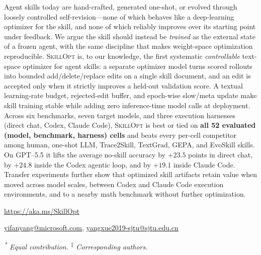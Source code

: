 \documentclass[
]{article}
\newcounter{none} %
\newcommand{\ourmethod}{\textsc{SkillOpt}\xspace}
\begin{document}
\vspace{0.45em}
\begin{msfttitlebox}
\setlength{\parindent}{0cm}
\setlength{\parskip}{0.14cm}
\raggedright
\nohyphens

Agent skills today are hand-crafted, generated one-shot, or evolved through loosely controlled self-revision---none of which behaves like a deep-learning optimizer for the skill, and none of which reliably improves over its starting point under feedback. We argue the skill should instead be \emph{trained} as the external state of a frozen agent, with the same discipline that makes weight-space optimization reproducible. \ourmethod{} is, to our knowledge, the first systematic \emph{controllable} text-space optimizer for agent skills: a separate optimizer model turns scored rollouts into bounded add/delete/replace edits on a single skill document, and an edit is accepted only when it strictly improves a held-out validation score. A textual learning-rate budget, rejected-edit buffer, and epoch-wise slow/meta update make skill training stable while adding zero inference-time model calls at deployment. Across six benchmarks, seven target models, and three execution harnesses (direct chat, Codex, Claude Code), \ourmethod{} is best or tied on \textbf{all 52 evaluated (model, benchmark, harness) cells} and beats every per-cell competitor among human, one-shot LLM, Trace2Skill, TextGrad, GEPA, and EvoSkill skills. On GPT--5.5 it lifts the average no-skill accuracy by $\mathbf{+23.5}$ points in direct chat, by $+24.8$ inside the Codex agentic loop, and by $+19.1$ inside Claude Code. Transfer experiments further show that optimized skill artifacts retain value when moved across model scales, between Codex and Claude Code execution environments, and to a nearby math benchmark without further optimization.

\vspace{0.14cm}
{\setlength{\parskip}{0.06cm}\small
{\href{https://aka.ms/SkillOpt}{https://aka.ms/SkillOpt}\par}
{
\href{mailto:yifanyang@microsoft.com}{yifanyang@microsoft.com},
\href{mailto:yangxue2019-sjtu@sjtu.edu.cn}{yangxue2019-sjtu@sjtu.edu.cn}\par}
}
\vspace{0.08cm}
{\footnotesize\rmfamily\itshape\color{msftgray}
\textsuperscript{*} Equal contribution. \quad \textsuperscript{$\ddagger$} Corresponding authors.\par}
\end{msfttitlebox}
\end{document}
